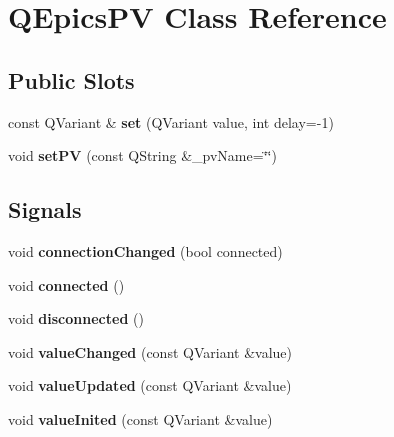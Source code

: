 \hypertarget{classQEpicsPV}{
\section{QEpicsPV Class Reference}
\label{classQEpicsPV}
}
\subsection*{Public Slots}
\begin{DoxyCompactItemize}
\item 
\hypertarget{classQEpicsPV_a94fc5c0d4bc062d55c7229d88711545f}{
const QVariant \& {\bfseries set} (QVariant value, int delay=-\/1)}
\label{classQEpicsPV_a94fc5c0d4bc062d55c7229d88711545f}

\item 
\hypertarget{classQEpicsPV_a23b67251fa4e87757796fb99fbccab03}{
void {\bfseries setPV} (const QString \&\_\-pvName=\char`\"{}\char`\"{})}
\label{classQEpicsPV_a23b67251fa4e87757796fb99fbccab03}

\end{DoxyCompactItemize}
\subsection*{Signals}
\begin{DoxyCompactItemize}
\item 
\hypertarget{classQEpicsPV_a21bde88413e855654c167b0558132d80}{
void {\bfseries connectionChanged} (bool connected)}
\label{classQEpicsPV_a21bde88413e855654c167b0558132d80}

\item 
\hypertarget{classQEpicsPV_ab78840133dacbcbf0f9e419df0fa4a85}{
void {\bfseries connected} ()}
\label{classQEpicsPV_ab78840133dacbcbf0f9e419df0fa4a85}

\item 
\hypertarget{classQEpicsPV_a747ff7e7041ed030c56a7953801c82ce}{
void {\bfseries disconnected} ()}
\label{classQEpicsPV_a747ff7e7041ed030c56a7953801c82ce}

\item 
\hypertarget{classQEpicsPV_ac790b59907122f89368b33b9eef2610b}{
void {\bfseries valueChanged} (const QVariant \&value)}
\label{classQEpicsPV_ac790b59907122f89368b33b9eef2610b}

\item 
\hypertarget{classQEpicsPV_a4b576d72a5ee23b5beb721800cc94040}{
void {\bfseries valueUpdated} (const QVariant \&value)}
\label{classQEpicsPV_a4b576d72a5ee23b5beb721800cc94040}

\item 
\hypertarget{classQEpicsPV_abfad70a9b9d0e2e1bb9416f504bdc470}{
void {\bfseries valueInited} (const QVariant \&value)}
\label{classQEpicsPV_abfad70a9b9d0e2e1bb9416f504bdc470}

\end{DoxyCompactItemize}

